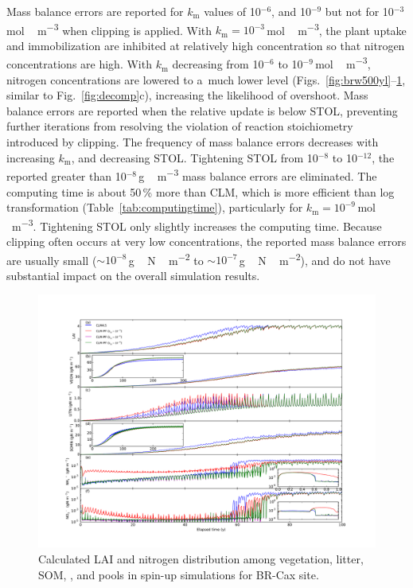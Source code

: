 \documentclass[gmd,noline]{copernicus}
\begin{document}
      Mass balance errors are reported for $k_\mathrm{m}$ values of
      10$^{-6}$, and 10$^{-9}$ but not for 10$^{-3}$\,\unit{mol\,m^{-3}}
      when clipping is applied.  With $k_\mathrm{m} =
      10^{-3}$\,\unit{mol\,m^{-3}}, the plant uptake and immobilization are
      inhibited at relatively high concentration so that nitrogen
      concentrations are high. With $k_\mathrm{m}$ decreasing from 10$^{-6}$
      to 10$^{-9}$\,\unit{mol\,m^{-3}}, nitrogen concentrations are lowered
      to a~much lower level (Figs.~\ref{fig:brw500yl}--\ref{fig:cax300yl},
      similar to Fig.~\ref{fig:decomp}c), increasing the likelihood of
      overshoot.  Mass balance errors are reported when the relative update
      is below STOL, preventing further iterations from resolving the
      violation of reaction stoichiometry introduced by clipping. The
      frequency of mass balance errors decreases with increasing
      $k_\mathrm{m}$, and decreasing STOL. Tightening STOL from 10$^{-8}$ to
      10$^{-12}$, the reported greater than 10$^{-8}$\,\unit{g\,m^{-3}} mass
      balance errors are eliminated. The computing time is about 50\,{\%}
      more than CLM, which is more efficient than log transformation
      (Table~\ref{tab:computingtime}), particularly for
      $k_\mathrm{m}=10^{-9}$\,\unit{mol\,m^{-3}}. Tightening STOL only
      slightly increases the computing time. Because clipping often occurs
      at very low concentrations, the reported mass balance errors are
      usually small ($\sim 10 ^{-8}$\,\unit{g\,N\,m^{-2}} to $\sim 10
      ^{-7}$\,\unit{g\,N\,m^{-2}}), and do not have substantial impact on
      the overall simulation results.


\begin{figure}
\includegraphics[width=130mm]{gmd-2015-254-f06.pdf}
\caption{Calculated LAI and nitrogen distribution among vegetation, litter,
SOM, , and  pools in spin-up simulations for BR-Cax
site.} \label{fig:cax300yl}
\end{figure}
\end{document}
